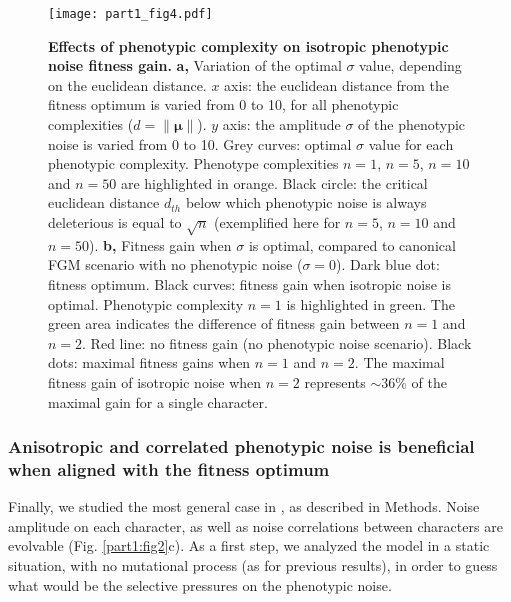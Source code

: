 \begin{figure}
\centering
\texttt{[image: part1\_fig4.pdf]}
\caption[Effects of phenotypic complexity on isotropic phenotypic noise fitness gain.]{\textbf{Effects of phenotypic complexity on isotropic phenotypic noise fitness gain.}
\textbf{a,} Variation of the optimal $\sigma$ value, depending on the euclidean distance. $x$ axis: the euclidean distance from the fitness optimum is varied from 0 to 10, for all phenotypic complexities ($d=\lVert \boldsymbol{\mu} \rVert$). $y$ axis: the amplitude $\sigma$ of the phenotypic noise is varied from 0 to 10. Grey curves: optimal $\sigma$ value for each phenotypic complexity. Phenotype complexities $n=1$, $n=5$, $n=10$ and $n=50$ are highlighted in orange. Black circle: the critical euclidean distance $d_{th}$ below which phenotypic noise is always deleterious is equal to $\sqrt{n}$ (exemplified here for $n=5$, $n=10$ and $n=50$).
\textbf{b,} Fitness gain when $\sigma$ is optimal, compared to canonical FGM scenario with no phenotypic noise ($\sigma = 0$). Dark blue dot: fitness optimum. Black curves: fitness gain when isotropic noise is optimal. Phenotypic complexity $n=1$ is highlighted in green. The green area indicates the difference of fitness gain between $n=1$ and $n=2$. Red line: no fitness gain (no phenotypic noise scenario). Black dots: maximal fitness gains when $n=1$ and $n=2$. The maximal fitness gain of isotropic noise when $n=2$ represents $\sim36\%$ of the maximal gain for a single character.
}
\label{part1:fig4}
\end{figure}


\subsubsection{Anisotropic and correlated phenotypic noise is beneficial when aligned with the fitness optimum}

Finally, we studied the most general case in {\sigmaFGM}, as described in Methods. Noise amplitude on each character, as well as noise correlations between characters are evolvable (Fig. \ref{part1:fig2}c). As a first step, we analyzed the model in a static situation, with no mutational process (as for previous results), in order to guess what would be the selective pressures on the phenotypic noise.

